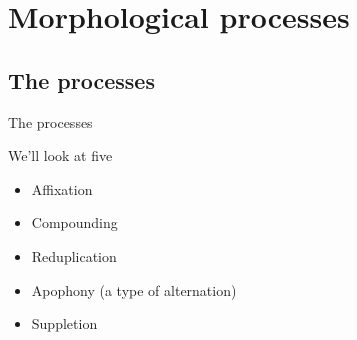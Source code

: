 \documentclass{beamer}
\subtitle[Morphological Processes]{Morphological Processes}
\newcommand{\suboneone}{The processes}
\begin{document}
  

  \section{Morphological processes}
    \subsection{\suboneone}
      \begin{frame}{\suboneone}
        \begin{block}{We'll look at five}
          \begin{itemize}
            \item Affixation
            \item Compounding
            \item Reduplication
            \item Apophony (a type of alternation)
            \item Suppletion
          \end{itemize}
        \end{block}
      \end{frame}
\end{document}
